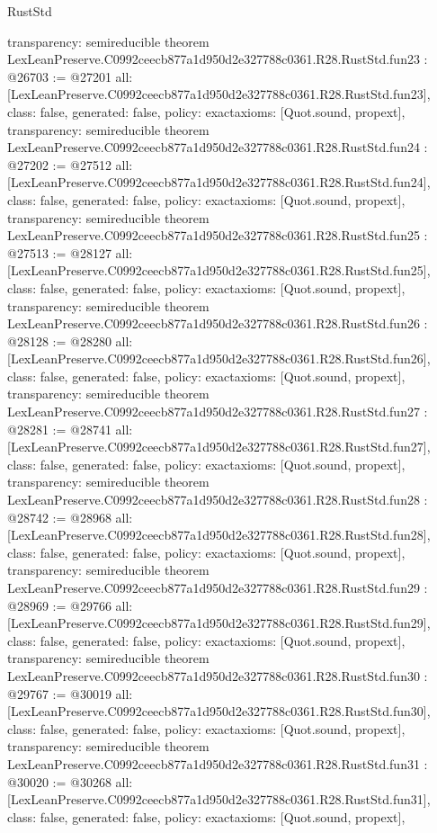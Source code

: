 \begin{lexlean}{RustStd}
\begin{coremodule}
{  transparency: semireducible
}
theorem LexLeanPreserve.C0992ceecb877a1d950d2e327788c0361.R28.RustStd.fun23 : @26703 := @27201 {
  all: [LexLeanPreserve.C0992ceecb877a1d950d2e327788c0361.R28.RustStd.fun23],
  class: false,
  generated: false,
  policy: exact{axioms: [Quot.sound, propext]},
  transparency: semireducible
}
theorem LexLeanPreserve.C0992ceecb877a1d950d2e327788c0361.R28.RustStd.fun24 : @27202 := @27512 {
  all: [LexLeanPreserve.C0992ceecb877a1d950d2e327788c0361.R28.RustStd.fun24],
  class: false,
  generated: false,
  policy: exact{axioms: [Quot.sound, propext]},
  transparency: semireducible
}
theorem LexLeanPreserve.C0992ceecb877a1d950d2e327788c0361.R28.RustStd.fun25 : @27513 := @28127 {
  all: [LexLeanPreserve.C0992ceecb877a1d950d2e327788c0361.R28.RustStd.fun25],
  class: false,
  generated: false,
  policy: exact{axioms: [Quot.sound, propext]},
  transparency: semireducible
}
theorem LexLeanPreserve.C0992ceecb877a1d950d2e327788c0361.R28.RustStd.fun26 : @28128 := @28280 {
  all: [LexLeanPreserve.C0992ceecb877a1d950d2e327788c0361.R28.RustStd.fun26],
  class: false,
  generated: false,
  policy: exact{axioms: [Quot.sound, propext]},
  transparency: semireducible
}
theorem LexLeanPreserve.C0992ceecb877a1d950d2e327788c0361.R28.RustStd.fun27 : @28281 := @28741 {
  all: [LexLeanPreserve.C0992ceecb877a1d950d2e327788c0361.R28.RustStd.fun27],
  class: false,
  generated: false,
  policy: exact{axioms: [Quot.sound, propext]},
  transparency: semireducible
}
theorem LexLeanPreserve.C0992ceecb877a1d950d2e327788c0361.R28.RustStd.fun28 : @28742 := @28968 {
  all: [LexLeanPreserve.C0992ceecb877a1d950d2e327788c0361.R28.RustStd.fun28],
  class: false,
  generated: false,
  policy: exact{axioms: [Quot.sound, propext]},
  transparency: semireducible
}
theorem LexLeanPreserve.C0992ceecb877a1d950d2e327788c0361.R28.RustStd.fun29 : @28969 := @29766 {
  all: [LexLeanPreserve.C0992ceecb877a1d950d2e327788c0361.R28.RustStd.fun29],
  class: false,
  generated: false,
  policy: exact{axioms: [Quot.sound, propext]},
  transparency: semireducible
}
theorem LexLeanPreserve.C0992ceecb877a1d950d2e327788c0361.R28.RustStd.fun30 : @29767 := @30019 {
  all: [LexLeanPreserve.C0992ceecb877a1d950d2e327788c0361.R28.RustStd.fun30],
  class: false,
  generated: false,
  policy: exact{axioms: [Quot.sound, propext]},
  transparency: semireducible
}
theorem LexLeanPreserve.C0992ceecb877a1d950d2e327788c0361.R28.RustStd.fun31 : @30020 := @30268 {
  all: [LexLeanPreserve.C0992ceecb877a1d950d2e327788c0361.R28.RustStd.fun31],
  class: false,
  generated: false,
  policy: exact{axioms: [Quot.sound, propext]},
}
\end{coremodule}
\end{lexlean}
